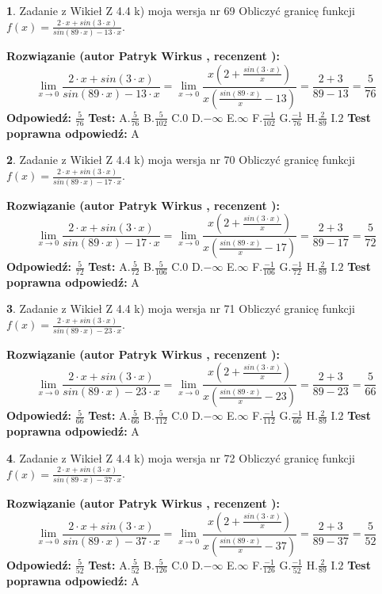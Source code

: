 \documentclass[12pt, a4paper]{article}
\theoremstyle{definition} %
\newtheorem{zad}{}
\newcommand{\zadStart}[1]{\begin{zad}#1\newline}
\newcommand{\zadStop}{\end{zad}}
\newcommand{\rozwStart}[2]{\noindent \textbf{Rozwiązanie (autor #1 , recenzent #2): }\newline}
\newcommand{\rozwStop}{\newline}
\newcommand{\odpStart}{\noindent \textbf{Odpowiedź:}\newline}
\newcommand{\odpStop}{\newline}
\newcommand{\testStart}{\noindent \textbf{Test:}\newline}
\newcommand{\testStop}{\newline}
\newcommand{\kluczStart}{\noindent \textbf{Test poprawna odpowiedź:}\newline}
\newcommand{\kluczStop}{\newline}
\begin{document}
\zadStart{Zadanie z Wikieł Z 4.4 k) moja wersja nr 69}
Obliczyć granicę funkcji $f(x)=\frac{2\cdot x +sin(3\cdot x)}{sin(89\cdot x) -13\cdot x}$.
\zadStop
\rozwStart{Patryk Wirkus}{}
$$\lim\limits_{x\to 0}\frac{2\cdot x +sin(3\cdot x)}{sin(89\cdot x) -13\cdot x}
=\lim\limits_{x\to 0}\frac{x(2+\frac{sin(3\cdot x)}{x})}{x(\frac{sin(89\cdot x)}{x}-13)}
=\frac{2+3}{89-13} = \frac{5}{76}$$
\rozwStop
\odpStart
$\frac{5}{76}$
\odpStop
\testStart
A.$\frac{5}{76}$
B.$\frac{5}{102}$
C.$0$
D.$-\infty$
E.$\infty$
F.$\frac{-1}{102}$
G.$\frac{-1}{76}$
H.$\frac{2}{89}$
I.$2$
\testStop
\kluczStart
A
\kluczStop



\zadStart{Zadanie z Wikieł Z 4.4 k) moja wersja nr 70}
Obliczyć granicę funkcji $f(x)=\frac{2\cdot x +sin(3\cdot x)}{sin(89\cdot x) -17\cdot x}$.
\zadStop
\rozwStart{Patryk Wirkus}{}
$$\lim\limits_{x\to 0}\frac{2\cdot x +sin(3\cdot x)}{sin(89\cdot x) -17\cdot x}
=\lim\limits_{x\to 0}\frac{x(2+\frac{sin(3\cdot x)}{x})}{x(\frac{sin(89\cdot x)}{x}-17)}
=\frac{2+3}{89-17} = \frac{5}{72}$$
\rozwStop
\odpStart
$\frac{5}{72}$
\odpStop
\testStart
A.$\frac{5}{72}$
B.$\frac{5}{106}$
C.$0$
D.$-\infty$
E.$\infty$
F.$\frac{-1}{106}$
G.$\frac{-1}{72}$
H.$\frac{2}{89}$
I.$2$
\testStop
\kluczStart
A
\kluczStop



\zadStart{Zadanie z Wikieł Z 4.4 k) moja wersja nr 71}
Obliczyć granicę funkcji $f(x)=\frac{2\cdot x +sin(3\cdot x)}{sin(89\cdot x) -23\cdot x}$.
\zadStop
\rozwStart{Patryk Wirkus}{}
$$\lim\limits_{x\to 0}\frac{2\cdot x +sin(3\cdot x)}{sin(89\cdot x) -23\cdot x}
=\lim\limits_{x\to 0}\frac{x(2+\frac{sin(3\cdot x)}{x})}{x(\frac{sin(89\cdot x)}{x}-23)}
=\frac{2+3}{89-23} = \frac{5}{66}$$
\rozwStop
\odpStart
$\frac{5}{66}$
\odpStop
\testStart
A.$\frac{5}{66}$
B.$\frac{5}{112}$
C.$0$
D.$-\infty$
E.$\infty$
F.$\frac{-1}{112}$
G.$\frac{-1}{66}$
H.$\frac{2}{89}$
I.$2$
\testStop
\kluczStart
A
\kluczStop



\zadStart{Zadanie z Wikieł Z 4.4 k) moja wersja nr 72}
Obliczyć granicę funkcji $f(x)=\frac{2\cdot x +sin(3\cdot x)}{sin(89\cdot x) -37\cdot x}$.
\zadStop
\rozwStart{Patryk Wirkus}{}
$$\lim\limits_{x\to 0}\frac{2\cdot x +sin(3\cdot x)}{sin(89\cdot x) -37\cdot x}
=\lim\limits_{x\to 0}\frac{x(2+\frac{sin(3\cdot x)}{x})}{x(\frac{sin(89\cdot x)}{x}-37)}
=\frac{2+3}{89-37} = \frac{5}{52}$$
\rozwStop
\odpStart
$\frac{5}{52}$
\odpStop
\testStart
A.$\frac{5}{52}$
B.$\frac{5}{126}$
C.$0$
D.$-\infty$
E.$\infty$
F.$\frac{-1}{126}$
G.$\frac{-1}{52}$
H.$\frac{2}{89}$
I.$2$
\testStop
\kluczStart
A
\kluczStop
\end{document}
